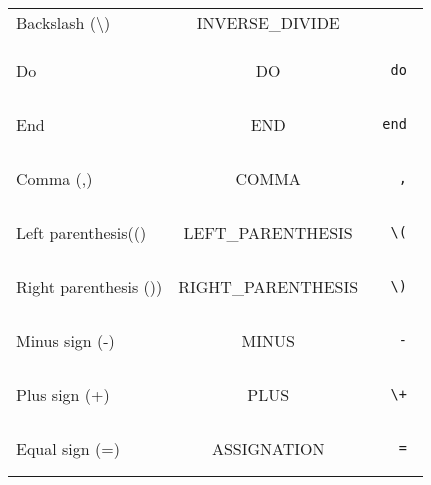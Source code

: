 \documentclass[a4paper,10pt]{article}
\begin{document}
\begin{tabular}{|l|c|r|}
Backslash (\textbackslash) & INVERSE\_DIVIDE & \begin{minipage}{2in} \begin{verbatim} \\ \end{verbatim} \end{minipage} \\
Do & DO & \begin{minipage}{2in} \begin{verbatim} do \end{verbatim} \end{minipage} \\
End & END & \begin{minipage}{2in} \begin{verbatim} end \end{verbatim} \end{minipage} \\
Comma (,) & COMMA & \begin{minipage}{2in} \begin{verbatim} , \end{verbatim} \end{minipage} \\
Left parenthesis(() & LEFT\_PARENTHESIS & \begin{minipage}{2in} \begin{verbatim} \( \end{verbatim} \end{minipage} \\
Right parenthesis ()) & RIGHT\_PARENTHESIS & \begin{minipage}{2in} \begin{verbatim} \) \end{verbatim} \end{minipage} \\
Minus sign (-) & MINUS & \begin{minipage}{2in} \begin{verbatim} - \end{verbatim} \end{minipage} \\
Plus sign (+) & PLUS & \begin{minipage}{2in} \begin{verbatim} \+ \end{verbatim} \end{minipage} \\
Equal sign (=) & ASSIGNATION & \begin{minipage}{2in} \begin{verbatim} = \end{verbatim} \end{minipage} \\

\end{tabular}
\end{document}
